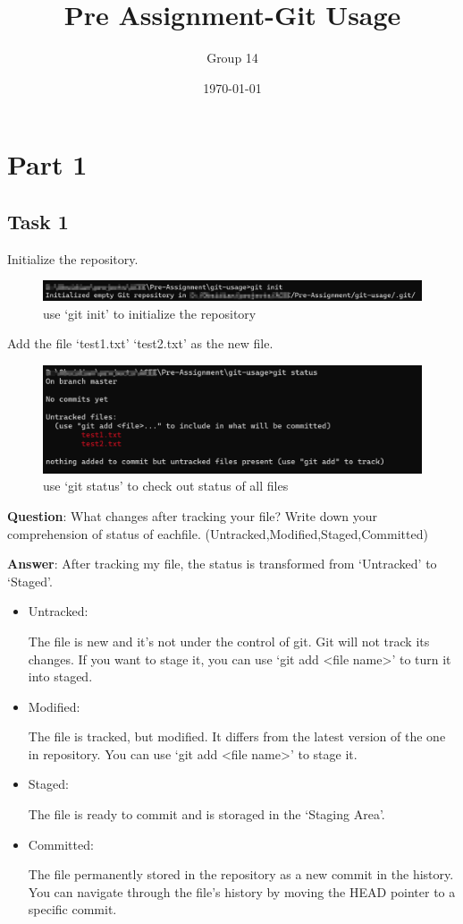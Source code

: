 \documentclass{article}
\title{Pre Assignment-Git Usage}
\author{Group 14}
\date{\today}
\begin{document}
\maketitle
\section{Part 1}
\subsection{Task 1}
Initialize the repository.
\begin{figure}[H]
    \centering
    \includegraphics[width = \textwidth]{../figures/init.png}
    \caption{use `git init' to initialize the repository}
\end{figure}

Add the file `test1.txt' `test2.txt' as the new file.
\begin{figure}[H]
\centering
\includegraphics[width = \textwidth]{../figures/status.png}
\caption{use `git status' to check out status of all files}
\end{figure}

\textbf{Question}: What changes after tracking your file? Write down your comprehension of status of eachfile. (Untracked,Modified,Staged,Committed)

\textbf{Answer}: After tracking my file, the status is transformed from `Untracked' to `Staged'.
\begin{itemize}
    \item Untracked:

    The file is new and it's not under the control of git. Git will not track its changes. If you want to stage it, you can use `git add <file name>' to turn it into staged.

    \item Modified:

    The file is tracked, but modified. It differs from the latest version of the one in repository. You can use `git add <file name>' to stage it.

    \item Staged:

    The file is ready to commit and is storaged in the `Staging Area'.

    \item Committed:

    The file permanently stored in the repository as a new commit in the history. You can navigate through the file's history by moving the HEAD pointer to a specific commit.
\end{itemize}
\end{document}

